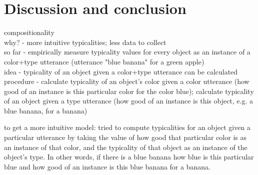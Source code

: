 \documentclass[10pt,letterpaper]{article}
\begin{document}



\section{\bf Discussion and conclusion}
compositionality\\
why? - more intuitive typicalities; less data to collect\\
so far - empirically measure typicality values for every object as an instance of a color+type utterance (utterance "blue banana" for a green apple)\\
idea - typicality of an object given a color+type utterance can be calculated \\
procedure - calculate typicality of an object's color given a color utterance (how good of an instance is this particular color for the color blue); calculate typicality of an object given a type utterance (how good of an instance is this object, e.g. a blue banana, for a banana)

to get a more intuitive model: tried to compute typicalities for an object given a particular utterance by taking the value of how good that particular color is as an instance of that color, and the typicality of that object as an instance of the object's type. In other words, if there is a blue banana how blue is this particular blue and how good of an instance is this blue banana for a banana.
\end{document}

